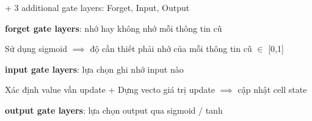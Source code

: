 \documentclass{article}
\begin{document}
+ 3 additional gate layers: Forget, Input, Output

\textbf{forget gate layers}: nhớ hay không nhớ mỗi thông tin cũ

Sử dụng sigmoid $\implies$ độ cần thiết phải nhớ của mỗi thông tin cũ $\in$ [0,1]

\textbf{input gate layers}: lựa chọn ghi nhớ input nào

Xác định value vần update + Dựng vecto giá trị update $\implies$ cập nhật cell state

\textbf{output gate layers}: lựa chọn output qua sigmoid / tanh
\end{document}
